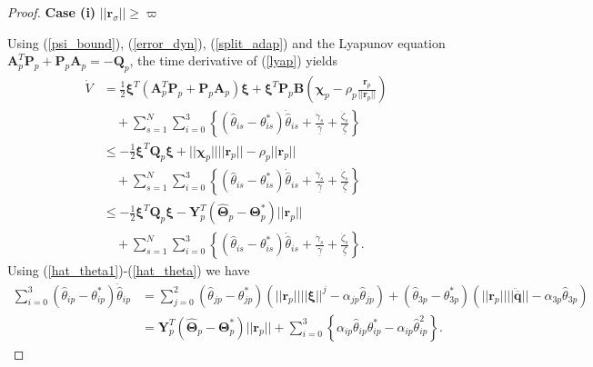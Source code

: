 \documentclass[AMA,STIX1COL,sort, compress]{WileyNJD-v2}
\begin{document}
\begin{proof}
	\noindent\textbf{Case (i)} $|| \mathbf{r}_\sigma || \geq \varpi$
	
	Using (\ref{psi_bound}), (\ref{error_dyn}), (\ref{split_adap}) and the Lyapunov equation $\mathbf{A}_p^T \mathbf P_p + \mathbf {P}_p \mathbf A_p= -\mathbf Q_{p}$, the time derivative of (\ref{lyap}) yields
	\begin{align}
	\dot{V}  &= \frac{1}{2} \boldsymbol{\xi}^T(\mathbf{A}_p^T \mathbf P_p+ \mathbf {P}_p \mathbf A_p ) \boldsymbol{\xi}+ \boldsymbol \xi^T \mathbf {P}_p \mathbf B \left(\boldsymbol \chi_p -  {\rho_p}\frac{\mathbf r_p}{|| \mathbf r_p||}  \right)\nonumber\\
	&\quad +\sum_{s=1}^{N} \sum_{i=0}^{3}\left \lbrace (\hat{\theta}_{is} -{\theta}_{is}^{*})\dot{\hat{\theta}}_{is}+ \frac{\dot{\gamma}_{s}}{ \underline{\gamma}} +\frac{\dot{\zeta}_{s}}{\underline{\zeta}} \right \rbrace \nonumber \\
	&\leq -\frac{1}{2} \boldsymbol{\xi}^T \mathbf Q_p\boldsymbol{\xi} + || \boldsymbol \chi_{p}  || || \mathbf{r}_p ||  - \rho_p{|| \mathbf r_p||} \nonumber \\
	& \quad +\sum_{s=1}^{N} \sum_{i=0}^{3}\left \lbrace (\hat{\theta}_{is} -{\theta}_{is}^{*})\dot{\hat{\theta}}_{is}+ \frac{\dot{\gamma}_{s}}{ \underline{\gamma}} +\frac{\dot{\zeta}_{s}}{\underline{\zeta}}\right \rbrace \\%
	& \leq  - \frac{1}{2} \boldsymbol{\xi}^T \mathbf Q_p\boldsymbol{\xi}  - \mathbf{Y}^T_p(\hat{\boldsymbol \Theta}_p-\boldsymbol \Theta_p^{*})  || \mathbf{r}_p ||  \nonumber\\
	& \quad +\sum_{s=1}^{N} \sum_{i=0}^{3}\left \lbrace (\hat{\theta}_{is} -{\theta}_{is}^{*})\dot{\hat{\theta}}_{is}+ \frac{\dot{\gamma}_{s}}{ \underline{\gamma}} +\frac{\dot{\zeta}_{s}}{\underline{\zeta}} \right \rbrace. \label{part 2}
	\end{align}
	Using (\ref{hat_theta1})-(\ref{hat_theta})  we have 
	\begin{align}
	\sum_{i=0}^{3}(\hat{\theta}_{ip}-{\theta}_{ip}^{*})\dot{\hat{\theta}}_{ip} & =\sum_{j=0}^{2} (\hat{\theta}_{jp}-{\theta}_{jp}^{*})(|| \mathbf{r}_p || || \boldsymbol \xi ||^{j} - \alpha_{jp}{\hat{\theta}}_{j p})+ (\hat{\theta}_{3p}-{\theta}_{3p}^{*})(|| \mathbf{r}_p || || \ddot{\overline{\mathbf q}} || - \alpha_{3p}{\hat{\theta}}_{3p}) \nonumber\\
	&  = \mathbf{Y}^T_p(\hat{\boldsymbol \Theta}_p-\boldsymbol \Theta_p^{*})  || \mathbf{r}_p ||   + \sum_{i=0}^{3} \left \lbrace\alpha_{ip}{\hat{\theta}}_{ip}{\theta}_{ip}^{*} -\alpha_{ip}{\hat{\theta}}_{ip}^2 \right \rbrace. \label{part 3}

\end{align}
\end{proof}
\end{document}
